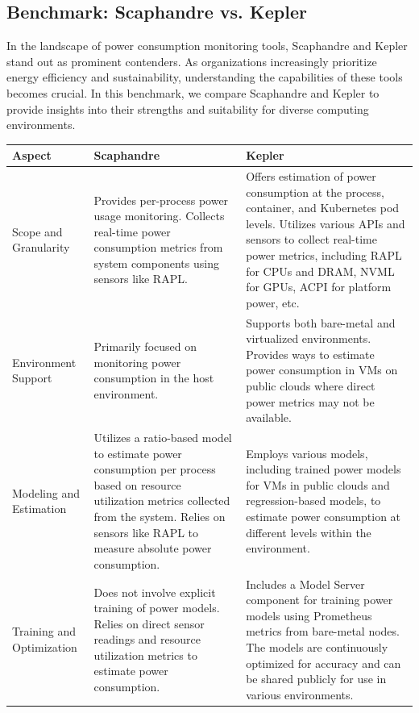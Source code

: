 \subsection{Benchmark: Scaphandre vs. Kepler}

In the landscape of power consumption monitoring tools, Scaphandre and Kepler stand out as prominent contenders. As organizations increasingly prioritize energy efficiency and sustainability, understanding the capabilities of these tools becomes crucial. In this benchmark, we compare Scaphandre and Kepler to provide insights into their strengths and suitability for diverse computing environments.

\begin{table}[htbp]
  \centering
  \begin{tabular}{|p{3cm}|p{6cm}|p{6cm}|}
  \hline
  \textbf{Aspect} & \textbf{Scaphandre} & \textbf{Kepler} \\
  \hline
  Scope and Granularity & Provides per-process power usage monitoring. Collects real-time power consumption metrics from system components using sensors like RAPL. & Offers estimation of power consumption at the process, container, and Kubernetes pod levels. Utilizes various APIs and sensors to collect real-time power metrics, including RAPL for CPUs and DRAM, NVML for GPUs, ACPI for platform power, etc. \\
  \hline
  Environment Support & Primarily focused on monitoring power consumption in the host environment. & Supports both bare-metal and virtualized environments. Provides ways to estimate power consumption in VMs on public clouds where direct power metrics may not be available. \\
  \hline
  Modeling and Estimation & Utilizes a ratio-based model to estimate power consumption per process based on resource utilization metrics collected from the system. Relies on sensors like RAPL to measure absolute power consumption. & Employs various models, including trained power models for VMs in public clouds and regression-based models, to estimate power consumption at different levels within the environment. \\
  \hline
  Training and Optimization & Does not involve explicit training of power models. Relies on direct sensor readings and resource utilization metrics to estimate power consumption. & Includes a Model Server component for training power models using Prometheus metrics from bare-metal nodes. The models are continuously optimized for accuracy and can be shared publicly for use in various environments. \\

\end{tabular}
\end{table}
